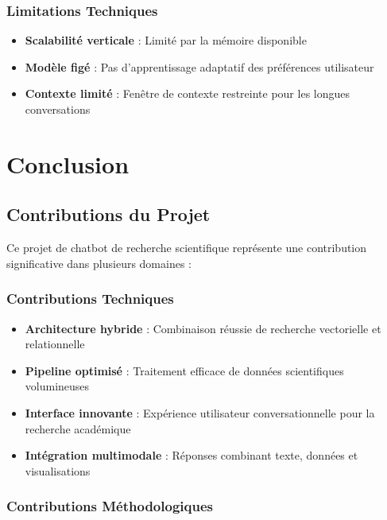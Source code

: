 \documentclass[12pt,a4paper]{article}
\begin{document}
\subsubsection{Limitations Techniques}

\begin{itemize}
    \item \textbf{Scalabilité verticale} : Limité par la mémoire disponible
    \item \textbf{Modèle figé} : Pas d'apprentissage adaptatif des préférences utilisateur
    \item \textbf{Contexte limité} : Fenêtre de contexte restreinte pour les longues conversations
\end{itemize}

\section{Conclusion}

\subsection{Contributions du Projet}

Ce projet de chatbot de recherche scientifique représente une contribution significative dans plusieurs domaines :

\subsubsection{Contributions Techniques}

\begin{itemize}
    \item \textbf{Architecture hybride} : Combinaison réussie de recherche vectorielle et relationnelle
    \item \textbf{Pipeline optimisé} : Traitement efficace de données scientifiques volumineuses
    \item \textbf{Interface innovante} : Expérience utilisateur conversationnelle pour la recherche académique
    \item \textbf{Intégration multimodale} : Réponses combinant texte, données et visualisations
\end{itemize}

\subsubsection{Contributions Méthodologiques}
\end{document}
